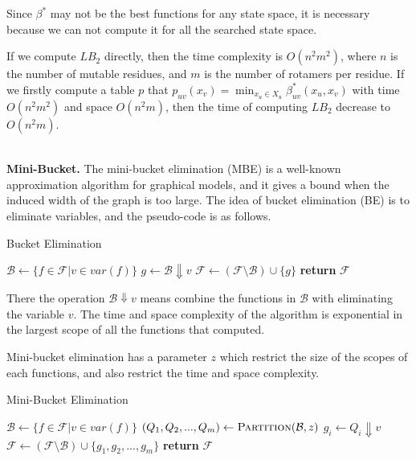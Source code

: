 Since $\beta^*$ may not be the best functions for any state space, it is necessary because we can not compute it for all the searched state space.

If we compute $LB_2$ directly, then the time complexity is $O(n^2m^2)$, where $n$ is the number of mutable residues, and $m$ is the number of rotamers per residue. If we firstly compute a table $p$ that $p_{uv}(x_v)=\min_{x_u\in X_u}\beta_{uv}^*(x_u,x_v)$ with time $O(n^2m^2)$ and space $O(n^2m)$, then the time of computing $LB_2$ decrease to $O(n^2m)$.

\ \\

\noindent\textbf{Mini-Bucket.}
The mini-bucket elimination (MBE) is a well-known approximation algorithm for graphical models, and it gives a bound when the induced width of the graph is too large. The idea of bucket elimination (BE) is to eliminate variables, and the pseudo-code is as follows.

\begin{algorithm}[!h]
\caption{Bucket Elimination}
\begin{algorithmic}[1]
    \State $\mathcal{B} \gets \{f\in\mathcal{F}|v\in var(f)\}$
    \State $g \gets \mathcal{B}\Downarrow v$
    \State $\mathcal{F} \gets (\mathcal{F}\setminus \mathcal{B})\cup\{g\}$
    \State \textbf{return }$\mathcal{F}$
\EndFunction
\end{algorithmic}
\end{algorithm}

There the operation $\mathcal{B}\Downarrow v$ means combine the functions in $\mathcal{B}$ with eliminating the variable $v$. The time and space complexity of the algorithm is exponential in the largest scope of all the functions that computed.

Mini-bucket elimination has a parameter $z$ which restrict the size of the scopes of each functions, and also restrict the time and space complexity.
\begin{algorithm}
\caption{Mini-Bucket Elimination}
\begin{algorithmic}[1]
    \State $\mathcal{B} \gets \{f\in\mathcal{F}|v\in var(f)\}$
    \State $(Q_1,Q_2,...,Q_m) \gets \textsc{Partition}(\mathcal{B},z)$
        \State $g_i\gets Q_i\Downarrow v$
    \EndFor
    \State $\mathcal{F} \gets (\mathcal{F}\setminus \mathcal{B})\cup\{g_1,g_2,...,g_m\}$
    \State \textbf{return }$\mathcal{F}$
\EndFunction
\end{algorithmic}
\end{algorithm}

